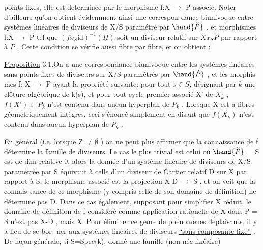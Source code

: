
points fixes, elle est déterminée  par le morphisme f:X $\longrightarrow$ P
associé. Noter d'ailleurs qu'on obtient évidemment ainsi une correspon
dance biunivoque entre systêmes linéaires de diviseurs de X/S paramétré
par $\hand{\check{P}}$ , et morphismes f:X $\longrightarrow$ P tel que $(fx_S\mathrm{id})^{-1}(\underline{H})$ soit un
diviseur  relatif sur $Xx_S\check{P}$ par rapport à $\check{P}$ . Cette  condition
se vérifie aussi fibre par fibre, et on obtient :

\uline{Proposition} 3.1.On a une correspondance biunivoque entre les 
systêmes linéaires sans points fixes de diviseurs sur X/S paramétrés par $\hand{\check{P}}$ , et les morphis
mes f: X $\longrightarrow$ P ayant la propriété suivante: pour tout $s\in S$, désignant
par $\bar{k}$ une clôture algébrique de k(s), et pour tout cycle premier associé
X' de $X_{\bar{k}}$ , $f(X')\subset P_{\bar{k}}$ n'est contenu dans aucun hyperplan de $P_{\bar{k}}$ .
\hand{(}Lorsque X est à fibres géométriquement  intègres, ceci 
 s'énoncé simplement en disant que $f(X_{\bar{k}})$ n'est contenu dans aucun
hyperplan de $P_{\bar{k}}$ \hand{)}.

En général (i.e.  lorsque Z $\neq \emptyset$ ) on ne peut plus affirmer que
la connaissance de f détermine la famille de diviseurs. Le cas le plus
trivial est celui où $\hand{\check{P}}$ = S est de dim relative 0, alors la donnée d'un systême linéaire de
diviseurs de X/S paramétrée par S équivaut à celle d'un diviseur de
Cartier relatif D sur X par rapport à S;  le morphisme
associé est la projection X-D $\longrightarrow$ S , et on voit  que la connais
sance de ce morphisme (y compris celle de son domaine de définition)
ne détermine pas D. Dans ce cas également, supposant pour simplifier X
réduit, le domaine de définition de  f  considéré
comme application rationelle de X dans P = S n'est pas X-D , mais X.
Pour éliminer ce genre de phénomènes déplaisants, il y a lieu de se bor-%
ner aux systêmes linéaires de diviseurs \uline{``sans composante fixe''} . De
façon générale, si S=Spec(k),  donné une famille (non néc linéaire)

